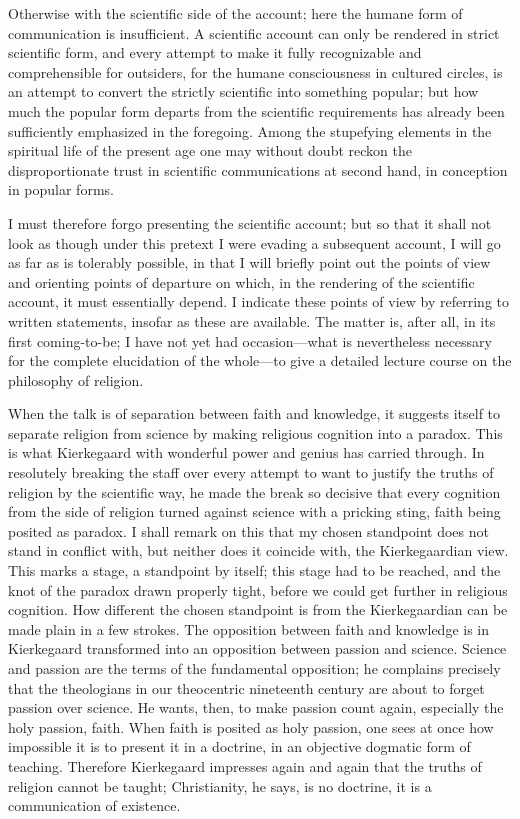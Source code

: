 \documentclass[12pt]{book}
\newcommand{\opage}[1]{\marginnote{\footnotesize\textit{[#1]}}}
\begin{document}
Otherwise with the scientific side of the account; here the humane form
of communication is insufficient. A scientific account can only be
rendered in strict scientific form, and every attempt to make it fully
recognizable and comprehensible for outsiders, for the humane
consciousness in cultured circles, is an attempt to convert the
strictly scientific into something popular; but how much the popular
form departs from the scientific requirements has already been
sufficiently emphasized in the
foregoing. Among the stupefying elements in the spiritual life of the
present age one may without doubt reckon the disproportionate trust in
scientific communications at second hand, in conception in popular
forms.

I must therefore forgo presenting the
\opage{229}\setcounter{footnote}{0}%
scientific account; but so that it shall not look as though under this
pretext I were evading a subsequent account, I will go as far as is
tolerably possible, in that I will briefly point out the points of view
and orienting points of departure on which, in the rendering of the
scientific account, it must essentially depend. I indicate these points
of view by referring to written statements, insofar as these are
available. The matter is, after all, in its first coming-to-be; I have
not yet had occasion---what is nevertheless necessary for the complete
elucidation of the whole---to give a detailed lecture course on the
philosophy of religion.

When the talk is of separation between faith and knowledge, it suggests
itself to separate religion from science by making religious cognition
into a paradox. This is what Kierkegaard with wonderful power and genius
has carried through. In resolutely breaking the staff over every attempt
to want to justify the truths of religion by the scientific way, he made
the break so decisive that every cognition from the side of religion
turned against science with a pricking sting, faith being posited as
paradox. I shall remark on this that my chosen standpoint does not stand
in conflict with, but neither does it coincide with, the Kierkegaardian
view. This marks a stage, a standpoint by itself; this stage had to be
reached, and the knot of the paradox drawn properly tight, before we
could get further in religious cognition. How different the chosen
standpoint is from the Kierkegaardian can be made plain in a few
strokes. The opposition between faith and knowledge is in Kierkegaard
transformed into an opposition between passion and science. Science and
passion are the terms of the fundamental opposition; he complains
precisely that the theologians in our theocentric nineteenth
\opage{230}\setcounter{footnote}{0}%
century are about to forget passion over science. He wants, then, to
make passion count again, especially the holy passion, faith. When faith
is posited as holy passion, one sees at once how impossible it is to
present it in a doctrine, in an objective dogmatic form of teaching.
Therefore Kierkegaard impresses again and again that the truths of
religion cannot be taught; Christianity, he says, is no doctrine, it is
a communication of existence.
\end{document}

